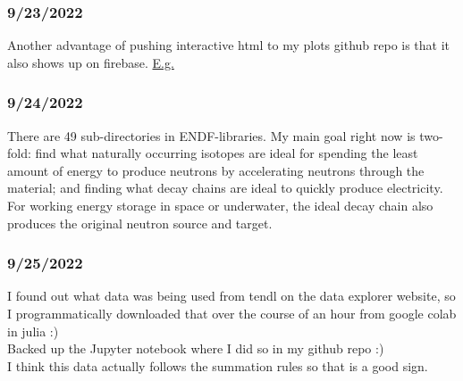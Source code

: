\documentclass[12pt]{article}
\begin{document}
\subsubsection{9/23/2022}
Another advantage of pushing interactive html to my plots github repo is that it also shows up on firebase.  \href{https://mp7635plots.web.app/avg_b_energy_vs_half_life.html}{E.g.}
\subsubsection{9/24/2022}
There are 49 sub-directories in ENDF-libraries. My main goal right now is two-fold: find what naturally occurring isotopes are ideal for spending the least amount of energy to produce neutrons by accelerating neutrons through the material; and finding what decay chains are ideal to quickly produce electricity. For working energy storage in space or underwater, the ideal decay chain also produces the original neutron source and target.
\subsubsection{9/25/2022}
I found out what data was being used from tendl on the data explorer website, so I programmatically downloaded that over the course of an hour from google colab in julia :) \\
Backed up the Jupyter notebook where I did so in my github repo :)\\
I think this data actually follows the summation rules so that is a good sign.
\end{document}
